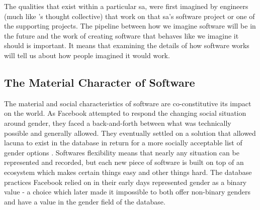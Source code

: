 \documentclass[a4paper,man,natbib]{apa6}
\begin{document}
  The qualities that exist within a particular \gls{sa}, were first imagined by engineers (much like \citet{Fleck2012-qr}'s thought collective) that work on that \gls{sa}'s software project or one of the supporting projects. The pipeline between how we imagine software will be in the future and the work of creating software that behaves like we imagine it should is important. It means that examining the details of how software works will tell us about how people imagined it would work.


  
  \subsection*{The Material Character of Software}
  The material and social characteristics of software are co-constitutive its impact on the world. As Facebook attempted to respond the changing social situation around gender, they faced a back-and-forth between what was technically possible and generally allowed. They eventually settled on a solution that allowed lacuna to exist in the database in return for a more socially acceptable list of gender options \citep{Bivens2017-tc}. Softwares flexibility means that nearly any situation can be represented and recorded, but each new piece of software is built on top of an ecosystem which makes certain things easy and other things hard. The database practices Facebook relied on in their early days represented gender as a binary value - a choice which later made it impossible to both offer non-binary genders and have a value in the gender field of the database.
\end{document}
